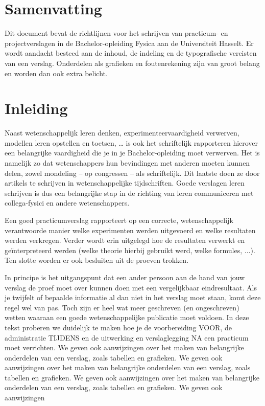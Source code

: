 \section{Samenvatting}
Dit document bevat de richtlijnen voor het schrijven van practicum- en projectverslagen in de Bachelor-opleiding Fysica aan de Universiteit Hasselt. Er wordt aandacht besteed aan de inhoud, de indeling en de typografische vereisten van een verslag. Onderdelen als grafieken en foutenrekening zijn van groot belang en worden dan ook extra belicht.

\section{Inleiding}
Naast wetenschappelijk leren denken, experimenteervaardigheid verwerven, modellen leren opstellen en toetsen, … is ook het schriftelijk rapporteren hierover een belangrijke vaardigheid die je in je Bachelor-opleiding moet verwerven. Het is namelijk zo dat wetenschappers hun bevindingen met anderen moeten kunnen delen, zowel mondeling – op congressen – als schriftelijk. Dit laatste doen ze door artikels te schrijven in wetenschappelijke tijdschriften. Goede verslagen leren schrijven is dus een belangrijke stap in de richting van leren communiceren met collega-fysici en andere wetenschappers.

Een goed practicumverslag rapporteert op een correcte, wetenschappelijk verantwoorde manier welke experimenten werden uitgevoerd en welke resultaten werden verkregen. Verder wordt erin uitgelegd hoe de resultaten verwerkt en geïnterpreteerd werden (welke theorie hierbij gebruikt werd, welke formules, ...). Ten slotte worden er ook besluiten uit de proeven trokken.

In principe is het uitgangspunt dat een ander persoon aan de hand van jouw verslag de proef moet over kunnen doen met een vergelijkbaar eindresultaat. Als je twijfelt of bepaalde informatie al dan niet in het verslag moet staan, komt deze regel wel van pas. Toch zijn er heel wat meer geschreven (en ongeschreven) wetten waaraan een goede wetenschappelijke publicatie moet voldoen. In deze tekst proberen we duidelijk te maken hoe je de voorbereiding VOOR, de administratie TIJDENS en de uitwerking en verslaglegging NA een practicum moet verrichten. We geven ook aanwijzingen over het maken van belangrijke onderdelen van een verslag, zoals tabellen en grafieken.
We geven ook aanwijzingen over het maken van belangrijke onderdelen van een verslag, zoals tabellen en grafieken. We geven ook aanwijzingen over het maken van belangrijke onderdelen van een verslag, zoals tabellen en grafieken. We geven ook aanwijzingen
